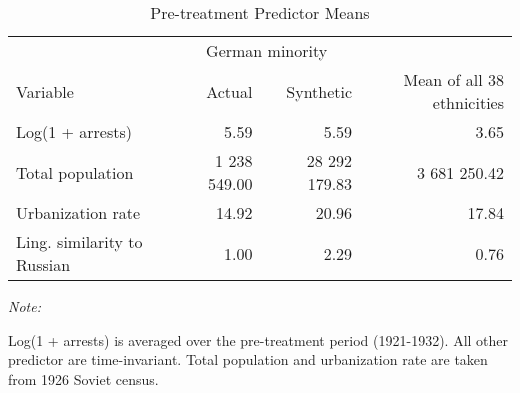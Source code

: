 \begin{table}[!h]

\caption{\label{tab:sc_predictor_means}Pre-treatment Predictor Means}
\centering
\begin{threeparttable}
\begin{tabular}{lrrr}
\toprule
\multicolumn{1}{c}{ } & \multicolumn{2}{c}{German minority} \\
\cmidrule(l{2pt}r{2pt}){2-3}
Variable & Actual & Synthetic & Mean of all 38 ethnicities\\
\midrule
Log(1 + arrests) & 5.59 & 5.59 & 3.65\\
Total population & 1 238 549.00 & 28 292 179.83 & 3 681 250.42\\
Urbanization rate & 14.92 & 20.96 & 17.84\\
Ling. similarity to Russian & 1.00 & 2.29 & 0.76\\
\bottomrule
\end{tabular}
\begin{tablenotes}
\item \textit{Note: } 
\item Log(1 + arrests) is averaged over the pre-treatment period (1921-1932). All other predictor are time-invariant. Total population and urbanization rate are taken from 1926 Soviet census.
\end{tablenotes}
\end{threeparttable}
\end{table}
